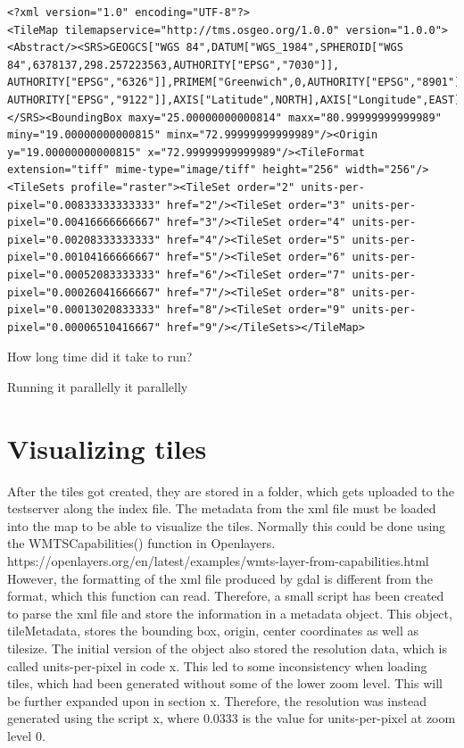 \begin{lstlisting}[language=HTML5, caption={The metadata from the xml file generated by the modified gdal2tiles}, label= VoresHTML,escapechar=|]
<?xml version="1.0" encoding="UTF-8"?>
<TileMap tilemapservice="http://tms.osgeo.org/1.0.0" version="1.0.0"><Abstract/><SRS>GEOGCS["WGS 84",DATUM["WGS_1984",SPHEROID["WGS 84",6378137,298.257223563,AUTHORITY["EPSG","7030"]],
AUTHORITY["EPSG","6326"]],PRIMEM["Greenwich",0,AUTHORITY["EPSG","8901"]],UNIT["degree",0.0174532925199433,
AUTHORITY["EPSG","9122"]],AXIS["Latitude",NORTH],AXIS["Longitude",EAST],AUTHORITY["EPSG","4326"]]
</SRS><BoundingBox maxy="25.00000000000814" maxx="80.99999999999989" miny="19.00000000000815" minx="72.99999999999989"/><Origin y="19.00000000000815" x="72.99999999999989"/><TileFormat extension="tiff" mime-type="image/tiff" height="256" width="256"/><TileSets profile="raster"><TileSet order="2" units-per-pixel="0.00833333333333" href="2"/><TileSet order="3" units-per-pixel="0.00416666666667" href="3"/><TileSet order="4" units-per-pixel="0.00208333333333" href="4"/><TileSet order="5" units-per-pixel="0.00104166666667" href="5"/><TileSet order="6" units-per-pixel="0.00052083333333" href="6"/><TileSet order="7" units-per-pixel="0.00026041666667" href="7"/><TileSet order="8" units-per-pixel="0.00013020833333" href="8"/><TileSet order="9" units-per-pixel="0.00006510416667" href="9"/></TileSets></TileMap>
\end{lstlisting}


How long time did it take to run?

Running it parallelly it parallelly 

\section{Visualizing tiles}
After the tiles got created, they are stored in a folder, which gets uploaded to the testserver along the index file. 
The metadata from the xml file must be loaded into the map to be able to visualize the tiles. Normally this could be done using the WMTSCapabilities() function in Openlayers.
https://openlayers.org/en/latest/examples/wmts-layer-from-capabilities.html 
However, the formatting of the xml file produced by gdal is different from the format, which this function can read. Therefore, a small script has been created to parse the xml file and store the information in a metadata object. This object, tileMetadata, stores the bounding box, origin, center coordinates as well as tilesize. The initial version of the object also stored the resolution data, which is called units-per-pixel in code x. This led to some inconsistency when loading tiles, which had been generated without some of the lower zoom level. This will be further expanded upon in section x. Therefore, the resolution was instead generated using the script x, where 0.0333 is the value for units-per-pixel at zoom level 0. 

